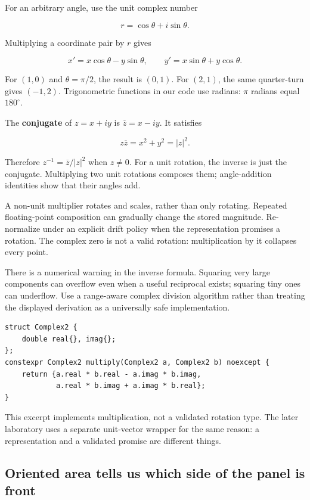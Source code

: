 For an arbitrary angle, use the unit complex number

\[
r=\cos\theta+i\sin\theta.
\]

Multiplying a coordinate pair by \(r\) gives

\[
x'=x\cos\theta-y\sin\theta,\qquad
y'=x\sin\theta+y\cos\theta.
\]

For \((1,0)\) and \(\theta=\pi/2\), the result is \((0,1)\). For \((2,1)\), the same quarter-turn gives \((-1,2)\). Trigonometric functions in our code use radians: \(\pi\) radians equal \(180^\circ\).

The \textbf{conjugate} of \(z=x+iy\) is \(\overline z=x-iy\). It satisfies

\[
z\overline z=x^2+y^2=|z|^2.
\]

Therefore \(z^{-1}=\overline z/|z|^2\) when \(z\ne0\). For a unit rotation, the inverse is just the conjugate. Multiplying two unit rotations composes them; angle-addition identities show that their angles add.

A non-unit multiplier rotates and scales, rather than only rotating. Repeated floating-point composition can gradually change the stored magnitude. Re-normalize under an explicit drift policy when the representation promises a rotation. The complex zero is not a valid rotation: multiplication by it collapses every point.

There is a numerical warning in the inverse formula. Squaring very large components can overflow even when a useful reciprocal exists; squaring tiny ones can underflow. Use a range-aware complex division algorithm rather than treating the displayed derivation as a universally safe implementation.

\begin{verbatim}
struct Complex2 {
    double real{}, imag{};
};
constexpr Complex2 multiply(Complex2 a, Complex2 b) noexcept {
    return {a.real * b.real - a.imag * b.imag,
            a.real * b.imag + a.imag * b.real};
}
\end{verbatim}

This excerpt implements multiplication, not a validated rotation type. The later laboratory uses a separate unit-vector wrapper for the same reason: a representation and a validated promise are different things.

\subsection{Oriented area tells us which side of the panel is front}\label{01-foundations-i-ch017-oriented-area-tells-us-which-side-of-the-panel-is-front}

